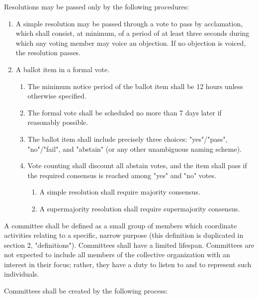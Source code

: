 \documentclass[11pt]{article}
\newcounter{h1}
\newcounter{h2}[h1]
\newcounter{h3}[h2]
\begin{document}

Resolutions may be passed only by the following procedures:

\begin{enumerate}
  \item A simple resolution may be passed through a vote to pass by acclamation, which shall consist, at minimum, of a period of at least three seconds during which any voting member may voice an objection. If no objection is voiced, the resolution passes.  
  \item A ballot item in a formal vote.  
  \begin{enumerate}
    \item  The minimum notice period of the ballot item shall be 12 hours unless otherwise specified.  
    \item The formal vote shall be scheduled no more than 7 days later if reasonably possible.  
    \item The ballot item shall include precisely three choices: "yes"/"pass", "no"/"fail", and "abstain" (or any other unambiguous naming scheme).  
    \item Vote counting shall discount all abstain votes, and the item shall pass if the required consensus is reached among "yes" and "no" votes.  
    \begin{enumerate}
      \item A simple resolution shall require majority consensus.  
      \item A supermajority resolution shall require supermajority consensus.
    \end{enumerate}
  \end{enumerate}
\end{enumerate}



A committee shall be defined as a small group of members which coordinate activities relating to a specific, narrow purpose (this definition is duplicated in section 2, "definitions"). Committees shall have a limited lifespan. Committees are not expected to include all members of the collective organization with an interest in their focus; rather, they have a duty to listen to and to represent such individuals.


Committees shall be created by the following process:
\end{document}
